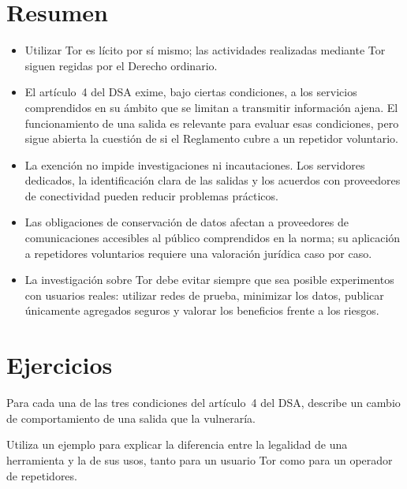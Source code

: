 \section*{Resumen}
\begin{itemize}
  \item Utilizar Tor es lícito por sí mismo; las actividades realizadas mediante Tor siguen regidas por el Derecho ordinario.
  \item El artículo~4 del DSA exime, bajo ciertas condiciones, a los servicios comprendidos en su ámbito que se limitan a transmitir información ajena. El funcionamiento de una salida es relevante para evaluar esas condiciones, pero sigue abierta la cuestión de si el Reglamento cubre a un repetidor voluntario.
  \item La exención no impide investigaciones ni incautaciones. Los servidores dedicados, la identificación clara de las salidas y los acuerdos con proveedores de conectividad pueden reducir problemas prácticos.
  \item Las obligaciones de conservación de datos afectan a proveedores de comunicaciones accesibles al público comprendidos en la norma; su aplicación a repetidores voluntarios requiere una valoración jurídica caso por caso.
  \item La investigación sobre Tor debe evitar siempre que sea posible experimentos con usuarios reales: utilizar redes de prueba, minimizar los datos, publicar únicamente agregados seguros y valorar los beneficios frente a los riesgos.
\end{itemize}

\section*{Ejercicios}

\begin{esercizio}[1]\label{es:25-condizioni}
Para cada una de las tres condiciones del artículo~4 del DSA, describe un cambio de comportamiento de una salida que la vulneraría.
\end{esercizio}

\begin{esercizio}[1]\label{es:25-strumento}
Utiliza un ejemplo para explicar la diferencia entre la legalidad de una herramienta y la de sus usos, tanto para un usuario Tor como para un operador de repetidores.
\end{esercizio}

